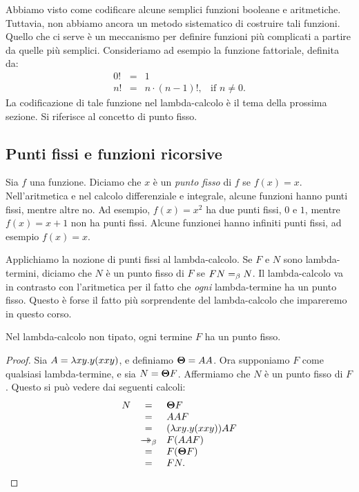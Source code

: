 \documentclass{article}
\begin{document}
Abbiamo visto come codificare alcune semplici funzioni
booleane e aritmetiche. Tuttavia, non abbiamo ancora un metodo sistematico
di costruire tali funzioni. Quello che ci serve \`e un meccanismo per definire
funzioni pi\`u complicati a partire da quelle pi\`u semplici. Consideriamo ad esempio
la funzione fattoriale, definita da:
\[ \begin{array}{rcll}
  0! &=& 1 \\
  n! &=& n\cdot (n-1)!,& \mbox{if $n\neq 0$}.
\end{array}
\]
La codificazione di tale funzione nel lambda-calcolo \`e il tema
della prossima sezione. Si riferisce al concetto di punto fisso.

\subsection{Punti fissi e funzioni ricorsive}\label{subsec-fixed-points}

Sia $f$ una funzione. Diciamo che $x$ \`e un {\em punto fisso} di $f$
se $f(x)=x$. Nell'aritmetica e nel calcolo differenziale e integrale, alcune
funzioni hanno punti fissi, mentre altre no. Ad esempio, $f(x)=x^2$ ha
due punti fissi, $0$ e $1$, mentre $f(x)=x+1$ non ha punti fissi.
Alcune funzionei hanno infiniti punti fissi, ad esempio $f(x)=x$.

Applichiamo la nozione di punti fissi al lambda-calcolo. Se $F$ e
$N$ sono lambda-termini, diciamo che $N$ \`e un punto fisso di $F$ se $FN=_{\beta}
N$.  Il lambda-calcolo va in contrasto con l'aritmetica per il fatto
che {\em ogni} lambda-termine ha un punto fisso. Questo \`e forse il fatto pi\`u
sorprendente del lambda-calcolo che impareremo in questo corso.

\begin{theorem}\label{thm-fix}
Nel lambda-calcolo non tipato, ogni termine $F$ ha un punto fisso.
\end{theorem}

\begin{proof}
  Sia $A=\lambda xy.y(xxy)$, e definiamo $\textbf{\boldmath $\Theta$}=AA$. Ora supponiamo $F$
  come qualsiasi lambda-termine, e sia $N=\textbf{\boldmath $\Theta$} F$. Affermiamo che $N$ \`e un
  punto fisso di $F$. Questo si pu\`o vedere dai seguenti calcoli:
\[ \begin{array}{rcl}
  N 
  &=& \textbf{\boldmath $\Theta$} F \\
  &=& AA F \\
  &=& (\lambda xy.y(xxy))AF \\
  &\mathrel{\rightarrow\!\!\!\!\!\rightarrow}_{\beta}& F(AAF) \\
  &=& F(\textbf{\boldmath $\Theta$} F) \\
  &=& FN.
\end{array}
\]
\eottwo
\end{proof}
\end{document}
